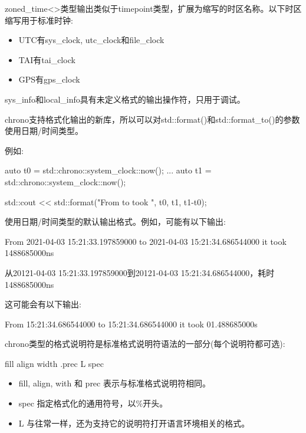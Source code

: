 zoned\_time<>类型输出类似于timepoint类型，扩展为缩写的时区名称。以下时区缩写用于标准时钟:

\begin{itemize}
\item
UTC有sys\_clock, utc\_clock和file\_clock

\item
TAI有tai\_clock

\item
GPS有gps\_clock
\end{itemize}

sys\_info和local\_info具有未定义格式的输出操作符，只用于调试。


chrono支持格式化输出的新库，所以可以对std::format()和std::format\_to()的参数使用日期/时间类型。

例如:

\begin{cpp}
auto t0 = std::chrono::system_clock::now();
...
auto t1 = std::chrono::system_clock::now();

std::cout << std::format("From {} to {}\nit took {}\n", t0, t1, t1-t0);
\end{cpp}

使用日期/时间类型的默认输出格式。例如，可能有以下输出:

\begin{shell}
From 2021-04-03 15:21:33.197859000 to 2021-04-03 15:21:34.686544000
it took 1488685000ns
\end{shell}

从20121-04-03 15:21:33.197859000到20121-04-03 15:21:34.686544000，耗时1488685000ns


这可能会有以下输出:

\begin{shell}
From 15:21:34.686544000 to 15:21:34.686544000 it took 01.488685000s
\end{shell}

chrono类型的格式说明符是标准格式说明符语法的一部分(每个说明符都可选):

\begin{shell}
fill align width .prec L spec
\end{shell}

\begin{itemize}
\item
fill, align, with 和 prec 表示与标准格式说明符相同。

\item
spec 指定格式化的通用符号，以\%开头。

\item
L 与往常一样，还为支持它的说明符打开语言环境相关的格式。
\end{itemize}

